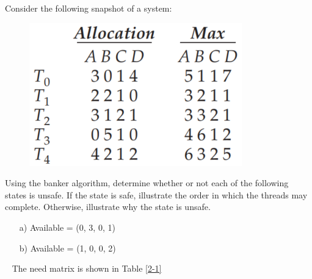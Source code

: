 \newpage

\begin{exercise}[]{Consider the following snapshot of a system:
    \begin{figure}[h]
        \begin{center}
            \includegraphics[scale=1]{fig8.9.png}
        \end{center}
    \end{figure}
    
    Using the banker algorithm, determine whether or not each of the following states is unsafe. If the state is safe, illustrate the order in which the threads may complete. Otherwise, illustrate why the state is unsafe.
    \begin{enumerate}
        \item [a)]
    Available = (0, 3, 0, 1)
    \item [b)]
    Available = (1, 0, 0, 2)
    \end{enumerate}
    
    }
  \begin{solution}
  \par{~}
  The need matrix is shown in Table \ref{2-1}


\end{solution}
\end{exercise}
